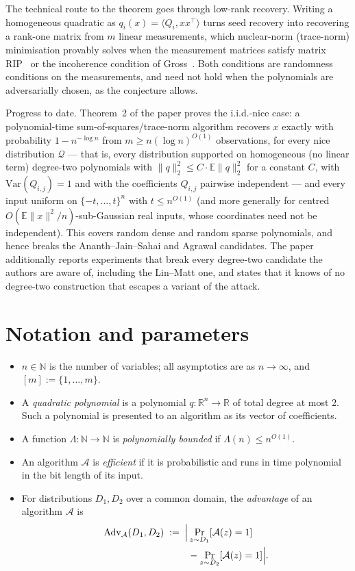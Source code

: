 \documentclass{aicr-conjecture}
\newcommand{\RR}{\mathbb{R}}
\newcommand{\NN}{\mathbb{N}}
\newcommand{\EE}{\mathbb{E}}
\newcommand{\cA}{\mathcal{A}}
\newcommand{\cQ}{\mathcal{Q}}
\newcommand{\Adv}{\mathrm{Adv}}
\begin{document}
The technical route to the theorem goes through low-rank recovery.
Writing a homogeneous quadratic as
$q_i(x) = \langle Q_i, xx^{\top} \rangle$ turns seed recovery into
recovering a rank-one matrix from $m$ linear measurements, which
nuclear-norm (trace-norm) minimisation provably solves when the
measurement matrices satisfy matrix RIP~\cite{RFP} or the incoherence
condition of Gross~\cite{Gross}. Both conditions are randomness
conditions on the measurements, and need not hold when the polynomials
are adversarially chosen, as the conjecture allows.

Progress to date. Theorem~2 of the paper proves the i.i.d.-nice case: a
polynomial-time sum-of-squares/trace-norm algorithm recovers $x$
exactly with probability $1 - n^{-\log n}$ from
$m \ge n(\log n)^{O(1)}$ observations, for every nice distribution
$\cQ$ --- that is, every distribution supported on homogeneous (no
linear term) degree-two polynomials with
$\|q\|_2^2 \le C \cdot \EE\|q\|_2^2$ for a constant $C$, with
$\mathrm{Var}(Q_{i,j}) = 1$ and with the coefficients $Q_{i,j}$
pairwise independent --- and every input uniform on
$\{-t, \dots, t\}^n$ with $t \le n^{O(1)}$ (and more generally for
centred $O(\EE\|x\|^2/n)$-sub-Gaussian real inputs, whose coordinates
need not be independent). This covers random dense and random sparse
polynomials, and hence breaks the Ananth--Jain--Sahai and Agrawal
candidates. The paper additionally reports experiments that break every
degree-two candidate the authors are aware of, including the Lin--Matt
one, and states that it knows of no degree-two construction that
escapes a variant of the attack.

\section{Notation and parameters}\label{sec:notation}

\begin{itemize}[leftmargin=1.2em]
  \item $n \in \NN$ is the number of variables; all asymptotics are as
  $n \to \infty$, and $[m] := \{1, \dots, m\}$.
  \item A \emph{quadratic polynomial} is a polynomial
  $q : \RR^n \to \RR$ of total degree at most $2$. Such a polynomial is
  presented to an algorithm as its vector of coefficients.
  \item A function $\Lambda : \NN \to \NN$ is \emph{polynomially
  bounded} if $\Lambda(n) \le n^{O(1)}$.
  \item An algorithm $\cA$ is \emph{efficient} if it is probabilistic
  and runs in time polynomial in the bit length of its input.
  \item For distributions $D_1, D_2$ over a common domain, the
  \emph{advantage} of an algorithm $\cA$ is
  \begin{align*}
    \Adv_{\cA}(D_1, D_2) \;:=\; \Bigl|
      &\Pr_{z \sim D_1}[\cA(z) = 1] \\
      &{}- \Pr_{z \sim D_2}[\cA(z) = 1] \Bigr| .
  \end{align*}
\end{itemize}
\end{document}

